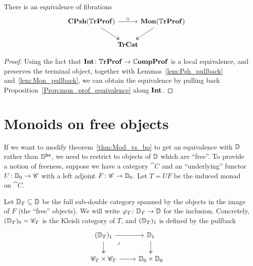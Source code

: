 \documentclass[12pt,oneside,article,draft]{memoir}
\begin{document}
\begin{corollary}\label{cor:Tr_mon_prof_equivalence}
   There is an equivalence of fibrations
   \begin{equation*}
      \begin{tikzcd}[column sep=-.5em]
         \CPsh(\dTrProf) \ar[rr,"\equiv"] \ar[dr,two heads]
            && \Mon(\dTrProf) \ar[dl,two heads] \\
            & \TrCat &
      \end{tikzcd}
   \end{equation*}
\end{corollary}
\begin{proof}
   Using the fact that $\mathbf{Int}\colon\mathbb{T}\mathbf{rProf}\to\mathbb{C}\mathbf{ompProf}$ is a local equivalence, and preserves the
   terminal object, together with Lemmas~\ref{lem:Psh_pullback} and~\ref{lem:Mon_pullback}, we can obtain the
   equivalence by pulling back Proposition~\ref{Prop:mon_prof_equivalence} along $\mathbf{Int}$.
\end{proof}


\section{Monoids on free objects}

If we want to modify theorem~\ref{thm:Mod_vs_bo} to get an equivalence with $\mathbb{D}$ rather than
$\mathbb{D}^{\mathsf{bo}}$, we need to restrict to objects of $\mathbb{D}$ which are ``free''. To provide a
notion of freeness, suppose we have a category $\cat{C}$ and an ``underlying'' functor
$U\colon\mathbb{D}_0\to\mathscr{C}$ with a left adjoint $F\colon\mathscr{C}\to\mathbb{D}_0$. Let $T=UF$ be the
induced monad on $\cat{C}$.

Let $\mathbb{D}_T\subseteq\mathbb{D}$ be the full sub-double category spanned by the objects in the image
of $F$ (the ``free'' objects). We will write $\varphi_T\colon\mathbb{D}_T\to\mathbb{D}$ for the
inclusion. Concretely, $(\mathbb{D}_T)_0=\mathscr{C}_{T}$ is the Kleisli category of $T$, and
$(\mathbb{D}_T)_1$ is defined by the pullback
\begin{equation*}
   \begin{tikzcd}
      (\dcat{D}_T)_1 \ar[r] \ar[d,two heads] \ar[dr,phantom,"\lrcorner" very near start]
         & \dcat{D}_1 \ar[d,two heads] \\
      \cat{C}_T\times\cat{C}_T \ar[r]
         & \dcat{D}_0\times\dcat{D}_0
   \end{tikzcd}
\end{equation*}
\end{document}
